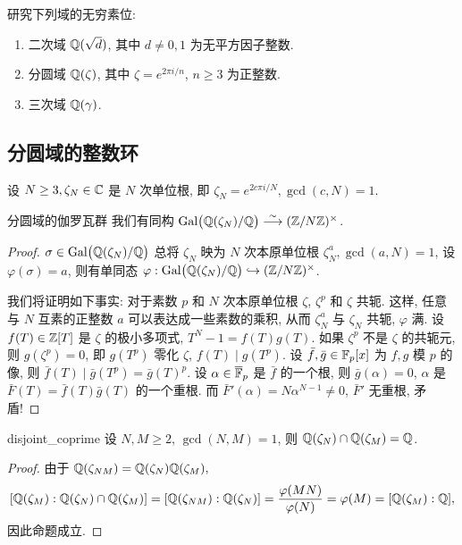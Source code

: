 \begin{exercise}
研究下列域的无穷素位: 
\begin{enumerate}
\item 二次域 ${\mathbb{Q}}(\sqrt{d})$, 其中 $d\neq 0,1$ 为无平方因子整数.
\item 分圆域 ${\mathbb{Q}}(\zeta)$, 其中 $\zeta=e^{2\pi i/n}$, $n\ge 3$ 为正整数.
\item 三次域 ${\mathbb{Q}}(\gamma)$.
\end{enumerate}
\end{exercise}


\subsection{分圆域的整数环}
设 $N\ge 3, \zeta_N\in{\mathbb{C}}$ 是 $N$ 次单位根, 即 $\zeta_N=e^{2c\pi i/N}, \gcd(c,N)=1$.

\begin{proposition}{分圆域的伽罗瓦群}{}
我们有同构 $\operatorname{{\mathrm{Gal}}}\bigl({\mathbb{Q}}(\zeta_N)/{\mathbb{Q}}\bigr)\stackrel{\sim}{\longrightarrow} ({\mathbb{Z}}/N{\mathbb{Z}})^\times$.
\end{proposition}
\begin{proof}
$\sigma\in \operatorname{{\mathrm{Gal}}}\bigl({\mathbb{Q}}(\zeta_N)/{\mathbb{Q}}\bigr)$ 总将 $\zeta_N$ 映为 $N$ 次本原单位根 $\zeta_N^a,\gcd(a,N)=1$, 设 $\varphi(\sigma)=a$, 则有单同态 $\varphi: \operatorname{{\mathrm{Gal}}}\bigl({\mathbb{Q}}(\zeta_N)/{\mathbb{Q}}\bigr)\hookrightarrow ({\mathbb{Z}}/N{\mathbb{Z}})^\times$.

我们将证明如下事实: 对于素数 $p$ 和 $N$ 次本原单位根 $\zeta$, $\zeta^p$ 和 $\zeta$ 共轭. 这样, 任意与 $N$ 互素的正整数 $a$ 可以表达成一些素数的乘积, 从而 $\zeta_N^a$ 与 $\zeta_N$ 共轭, $\varphi$ 满. 设 $f(T)\in{\mathbb{Z}}[T]$ 是 $\zeta$ 的极小多项式, $T^N-1=f(T)g(T)$. 如果 $\zeta^p$ 不是 $\zeta$ 的共轭元, 则 $g(\zeta^p)=0$, 即 $g(T^p)$ 零化 $\zeta$, $f(T)\mid g(T^p)$. 设 $\bar f,\bar g\in{\mathbb{F}}_p[x]$ 为 $f,g$ 模 $p$ 的像, 则 $\bar f(T)\mid \bar g(T^p)=\bar g(T)^p$. 设 $\alpha\in\overline{{\mathbb{F}}}_p$ 是 $\bar f$ 的一个根, 则 $\bar g(\alpha)=0$, $\alpha$ 是 $\bar F(T)=\bar f(T)\bar g(T)$ 的一个重根. 而 $\bar F'(\alpha)=N\alpha^{N-1}\neq 0$, $\bar F'$ 无重根, 矛盾! 
\end{proof}

\begin{corollary}{}{disjoint_coprime}
设 $N,M\ge 2$, $\gcd(N,M)=1$, 则 ${\mathbb{Q}}(\zeta_N)\cap {\mathbb{Q}}(\zeta_M)={\mathbb{Q}}$.
\end{corollary}
\begin{proof}
由于 ${\mathbb{Q}}(\zeta_{NM})={\mathbb{Q}}(\zeta_N){\mathbb{Q}}(\zeta_M),$
	\[[{\mathbb{Q}}(\zeta_M):{\mathbb{Q}}(\zeta_N)\cap {\mathbb{Q}}(\zeta_M)]
	=[{\mathbb{Q}}(\zeta_{NM}):{\mathbb{Q}}(\zeta_N)]
	=\frac{\varphi(MN)}{\varphi(N)}
	=\varphi(M)
	=[{\mathbb{Q}}(\zeta_M):{\mathbb{Q}}],\]
因此命题成立.
\end{proof}


